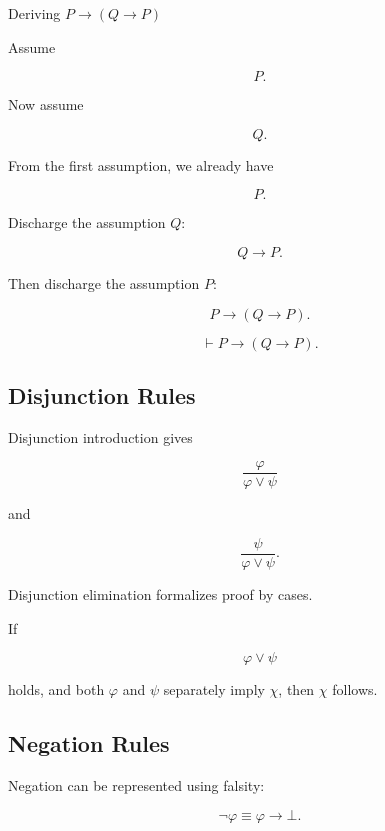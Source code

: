 \begin{workedexamplebox}{Deriving \(P\rightarrow(Q\rightarrow P)\)}

Assume

\[
P.
\]

Now assume

\[
Q.
\]

From the first assumption, we already have

\[
P.
\]

Discharge the assumption \(Q\):

\[
Q\rightarrow P.
\]

Then discharge the assumption \(P\):

\[
P\rightarrow(Q\rightarrow P).
\]

\begin{answerbox}
\[
\boxed{
\vdash
P\rightarrow(Q\rightarrow P).
}
\]
\end{answerbox}

\end{workedexamplebox}

\subsection{Disjunction Rules}
\label{subsec:natural-deduction-disjunction}

Disjunction introduction gives

\[
\boxed{
\frac{
\varphi
}{
\varphi\lor\psi
}
}
\]

and

\[
\boxed{
\frac{
\psi
}{
\varphi\lor\psi
}.
}
\]

Disjunction elimination formalizes proof by cases.

If

\[
\varphi\lor\psi
\]

holds, and both \(\varphi\) and \(\psi\) separately imply \(\chi\), then
\(\chi\) follows.

\subsection{Negation Rules}
\label{subsec:natural-deduction-negation}

Negation can be represented using falsity:

\[
\boxed{
\neg\varphi
\equiv
\varphi\rightarrow\bot.
}
\]

